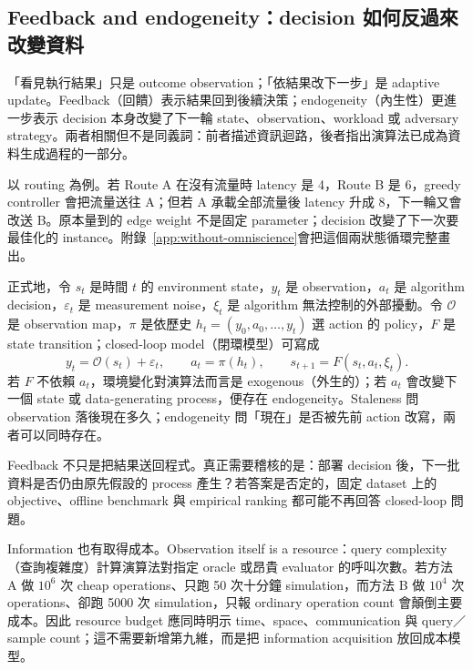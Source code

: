 \documentclass[11pt,a4paper,oneside,openany]{book}
\begin{document}
\subsection{Feedback and endogeneity：decision 如何反過來改變資料}

「看見執行結果」只是 outcome observation；「依結果改下一步」是 adaptive update。Feedback（回饋）表示結果回到後續決策；endogeneity（內生性）更進一步表示 decision 本身改變了下一輪 state、observation、workload 或 adversary strategy。兩者相關但不是同義詞：前者描述資訊迴路，後者指出演算法已成為資料生成過程的一部分。

以 routing 為例。若 Route A 在沒有流量時 latency 是 4，Route B 是 6，greedy controller 會把流量送往 A；但若 A 承載全部流量後 latency 升成 8，下一輪又會改送 B。原本量到的 edge weight 不是固定 parameter；decision 改變了下一次要最佳化的 instance。附錄~\ref{app:without-omniscience}會把這個兩狀態循環完整畫出。

正式地，令 $s_t$ 是時間 $t$ 的 environment state，$y_t$ 是 observation，$a_t$ 是 algorithm decision，$\varepsilon_t$ 是 measurement noise，$\xi_t$ 是 algorithm 無法控制的外部擾動。令 $\mathcal O$ 是 observation map，$\pi$ 是依歷史 $h_t=(y_0,a_0,\ldots,y_t)$ 選 action 的 policy，$F$ 是 state transition；closed-loop model（閉環模型）可寫成
\begin{equation}
 \label{eq:closed-loop-model}
 y_t=\mathcal O(s_t)+\varepsilon_t,
 \qquad
 a_t=\pi(h_t),
 \qquad
 s_{t+1}=F(s_t,a_t,\xi_t).
\end{equation}
若 $F$ 不依賴 $a_t$，環境變化對演算法而言是 exogenous（外生的）；若 $a_t$ 會改變下一個 state 或 data-generating process，便存在 endogeneity。Staleness 問 observation 落後現在多久；endogeneity 問「現在」是否被先前 action 改寫，兩者可以同時存在。

\begin{coreintuition}
Feedback 不只是把結果送回程式。真正需要稽核的是：部署 decision 後，下一批資料是否仍由原先假設的 process 產生？若答案是否定的，固定 dataset 上的 objective、offline benchmark 與 empirical ranking 都可能不再回答 closed-loop 問題。
\end{coreintuition}

Information 也有取得成本。Observation itself is a resource：query complexity（查詢複雜度）計算演算法對指定 oracle 或昂貴 evaluator 的呼叫次數。若方法 A 做 $10^6$ 次 cheap operations、只跑 50 次十分鐘 simulation，而方法 B 做 $10^4$ 次 operations、卻跑 5000 次 simulation，只報 ordinary operation count 會顛倒主要成本。因此 resource budget 應同時明示 time、space、communication 與 query／sample count；這不需要新增第九維，而是把 information acquisition 放回成本模型。
\end{document}
